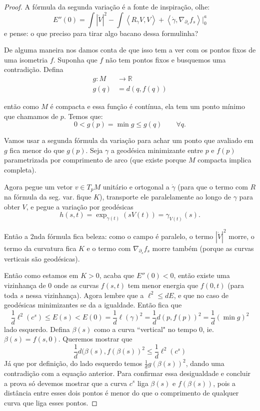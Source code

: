 \begin{proof}
       A fórmula da segunda variação é a fonte de inspiração, olhe:
$$
E''(0)=\int |\dot V|^2-\int\left<R_ {\dot \gamma}V,V\right>+\left<\dot\gamma,\nabla_{\partial_s}f_s\right>|_{0}^a
$$
e pense: o que preciso para tirar algo bacano dessa formulinha?

De alguma maneira nos damos conta de que isso tem a ver com os pontos fixos de
uma isometria $f$. Suponha que $f$ não tem pontos fixos e busquemos uma
contradição. Defina
\begin{align*}
g: M &\longrightarrow \mathbb{R} \\
g(q) &=d(q,f(q))
\end{align*}

então como $M$ é compacta e essa função é contínua, ela tem um ponto mínimo que
chamamos de $p$. Temos que:
$$
0<g(p)=\operatorname{min}g\leq g(q)\qquad \forall q.
$$

Vamos usar a segunda fórmula da variação para achar um ponto que avaliado em $g$
fica menor do que $g(p)$. Seja $\gamma$ a geodésica minimizante entre $p$ e
$f(p)$ parametrizada por comprimento de arco (que existe porque $M$ compacta
implica completa).

Agora pegue um vetor $v \in T_pM$ unitário e ortogonal a $\dot \gamma$ (para que
o termo com $R$ na fórmula da seg. var. fique $K$), transporte ele paralelamente
ao longo de $\gamma$ para obter $V$, e pegue a variação por geodésicas
\[h(s,t)=\operatorname{exp}_{\gamma(t)}(sV(t))=\gamma_{V(t)}(s).\]

Então a 2nda fórmula fica beleza: como o campo é paralelo, o termo $|\dot V|^2$
morre, o termo da curvatura fica $K$ e o termo com $\nabla_{\partial_s}f_s$
morre também (porque as curvas verticais são geodésicas).

Então como estamos em $K>0$, acaba que $E''(0)<0$, então existe uma vizinhança
de $0$  onde as curvas $f(s,t)$ tem menor energia que $f(0,t)$ (para toda $s$
nessa  vizinhança). Agora lembre que a $\ell^2 \leq dE$, e que no caso de
geodésicas minimizantes se da a igualdade. Então fica que
$$
\frac{1}{d}\ell^2(c^s)\leq
E(s)<E(0)=\frac{1}{d}\ell(\gamma)^2=\frac{1}{d}d(p,f(p))^2
=\frac{1}{d}(\operatorname{min}g)^2
$$
lado esquerdo. Defina $\beta(s)$ como a curva ``vertical" no tempo 0, ie.
$\beta(s)=f(s,0)$. Queremos mostrar que
$$
\frac{1}{d}d(\beta(s),f(\beta(s))^2\leq \frac{1}{d}\ell^2(c^s)
$$
Já que por definição, do lado esquerdo temos $\frac{1}{d}g(\beta(s))^2$, dando
uma contradição com a equação anterior. Para confirmar essa desigualdade e
concluir a prova só devemos mostrar que a curva $c^s$ liga $\beta(s)$ e
$f(\beta(s))$, pois a distância entre esses dois pontos é menor do que o
comprimento de qualquer curva que liga esses pontos.


\end{proof}
